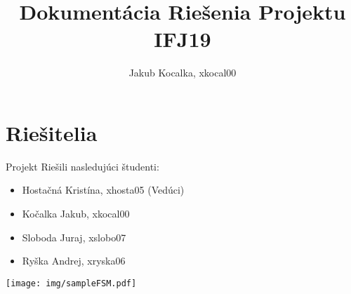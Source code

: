 \documentclass[10pt,a4paper]{article}
\author{Jakub Kocalka, xkocal00}
\title{Dokumentácia Riešenia Projektu IFJ19}
\begin{document}
	\maketitle
	
	\section{Riešitelia}
	Projekt Riešili nasledujúci študenti:
	\begin{itemize}
		\item Hostačná Kristína, xhosta05 (Vedúci)
		\item Kočalka Jakub, xkocal00
		\item Sloboda Juraj, xslobo07
		\item Ryška Andrej, xryska06
	\end{itemize}

	\texttt{[image: img/sampleFSM.pdf]}
\end{document}
